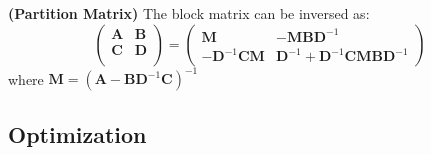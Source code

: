 \begin{proposition}{\textbf{(Partition Matrix)}}
    The block matrix can be inversed as:
    \begin{equation*}
    \begin{pmatrix}
        \boldsymbol A & \boldsymbol B \\
        \boldsymbol C & \boldsymbol D \\
    \end{pmatrix} = \begin{pmatrix}
        \boldsymbol M & - \boldsymbol M\boldsymbol B\boldsymbol D^{-1} \\
        -\boldsymbol D^{-1}\boldsymbol C\boldsymbol M & \boldsymbol D^{-1}+\boldsymbol D^{-1}\boldsymbol C\boldsymbol M\boldsymbol B\boldsymbol D^{-1}
    \end{pmatrix}
    \end{equation*}
    where $\boldsymbol M = (\boldsymbol A-\boldsymbol B\boldsymbol D^{-1}\boldsymbol C)^{-1}$
\end{proposition}

\subsection{Optimization}

